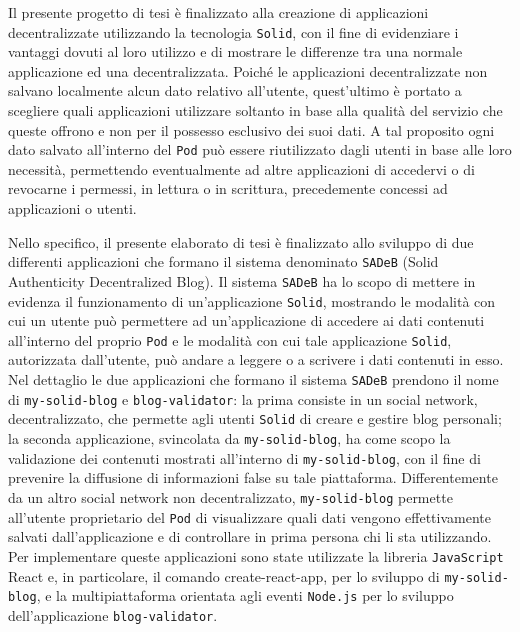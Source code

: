 \bigskip

Il presente progetto di tesi è finalizzato alla creazione di applicazioni decentralizzate utilizzando la tecnologia {\tt Solid}, con il fine di evidenziare i vantaggi dovuti al loro utilizzo e di mostrare le differenze tra una normale applicazione ed una decentralizzata. Poiché le applicazioni decentralizzate non salvano localmente alcun dato relativo all'utente, quest'ultimo è portato a scegliere quali applicazioni utilizzare soltanto in base alla qualità del servizio che queste offrono e non per il possesso esclusivo dei suoi dati. A tal proposito ogni dato salvato all'interno del {\tt Pod} può essere riutilizzato dagli utenti in base alle loro necessità, permettendo eventualmente ad altre applicazioni di accedervi o di revocarne i permessi, in lettura o in scrittura, precedemente concessi ad applicazioni o utenti.

\bigskip


Nello specifico, il presente elaborato di tesi è finalizzato allo sviluppo di due differenti applicazioni che formano il sistema denominato {\tt SADeB} (Solid Authenticity Decentralized Blog). Il sistema {\tt SADeB} ha lo scopo di mettere in evidenza il funzionamento di un'applicazione {\tt Solid}, mostrando le modalità con cui un utente può permettere ad un'applicazione di accedere ai dati contenuti all'interno del proprio {\tt Pod} e le modalità con cui tale applicazione {\tt Solid}, autorizzata dall'utente, può andare a leggere o a scrivere i dati contenuti in esso. Nel dettaglio le due applicazioni che formano il sistema {\tt SADeB} prendono il nome di {\tt my-solid-blog} e {\tt blog-validator}: la prima consiste in un social network, decentralizzato, che permette agli utenti {\tt Solid} di creare e gestire blog personali; la seconda applicazione, svincolata da {\tt my-solid-blog}, ha come scopo la validazione dei contenuti mostrati all'interno di {\tt my-solid-blog}, con il fine di prevenire la diffusione di informazioni false su tale piattaforma. Differentemente da un altro social network non decentralizzato, {\tt my-solid-blog} permette all'utente proprietario del {\tt Pod} di visualizzare quali dati vengono effettivamente salvati dall'applicazione e di controllare in prima persona chi li sta utilizzando. Per implementare queste applicazioni sono state utilizzate la libreria {\tt JavaScript} React e, in particolare, il comando create-react-app, per lo sviluppo di {\tt my-solid-blog}, e la multipiattaforma orientata agli eventi {\tt Node.js} per lo sviluppo dell'applicazione {\tt blog-validator}. 

